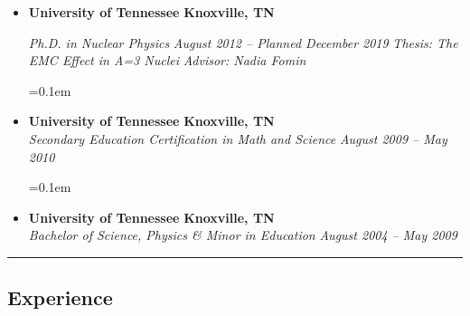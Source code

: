\begin{itemize}
\parskip=0.1em

\item 
\headerrow
{\textbf{University of Tennessee}}
{\textbf{Knoxville, TN}}

\headerrow
{\emph{Ph.D. in Nuclear Physics}}
{\emph{August 2012 -- Planned December 2019}}
\headerrow
{\emph{Thesis: The EMC Effect in A=3 Nuclei}}
{\emph{Advisor: Nadia Fomin}}


\parskip=0.1em

\item 
\headerrow
{\textbf{University of Tennessee}}
{\textbf{Knoxville, TN}}
\\
\headerrow
{\emph{Secondary Education Certification in Math and Science}}
{\emph{August 2009 -- May 2010}}


\parskip=0.1em

\item 
\headerrow
{\textbf{University of Tennessee}}
{\textbf{Knoxville, TN}}
\\
\headerrow
{\emph{Bachelor of Science, Physics \& Minor in Education }}
{\emph{August 2004 -- May 2009}}


\end{itemize}
\hrule
\vspace{-0.4em}
\subsection*{Experience}

